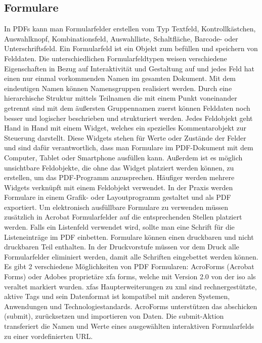 \subsection{Formulare}
In PDFs kann man Formularfelder erstellen vom Typ Textfeld, Kontrollkästchen, Auswahlknopf, Kombinationsfeld, Auswahlliste, Schaltfläche, Barcode- oder Unterschriftsfeld. Ein Formularfeld ist ein Objekt zum befüllen und speichern von Felddaten. Die unterschiedlichen Formularfeldtypen weisen verschiedene Eigenschaften in Bezug auf Interaktivität und Gestaltung auf und jedes Feld hat einen nur einmal vorkommenden Namen im gesamten Dokument. Mit dem eindeutigen Namen können Namensgruppen realisiert werden. Durch eine hierarchische Struktur mittels Teilnamen die mit einem Punkt voneinander getrennt sind mit dem äußersten Gruppennamen zuerst können Felddaten noch besser und logischer beschrieben und strukturiert werden. Jedes Feldobjekt geht Hand in Hand mit einem Widget, welches ein spezielles Kommentarobjekt zur Steuerung darstellt. Diese Widgets stehen für Werte oder Zustände der Felder und sind dafür verantwortlich, dass man Formulare im PDF-Dokument mit dem Computer, Tablet oder Smartphone ausfüllen kann. Außerdem ist es möglich unsichtbare Feldobjekte, die ohne das Widget platziert werden können, zu erstellen, um das PDF-Programm anzusprechen. Häufiger werden mehrere Widgets verknüpft mit einem Feldobjekt verwendet. \cite{softx}
In der Praxis werden Formulare in einem Grafik- oder Layoutprogramm gestaltet und als PDF exportiert. Um elektronisch ausfüllbare Formulare zu verwenden müssen zusätzlich in Acrobat Formularfelder auf die entsprechenden Stellen platziert werden. Falls ein Listenfeld verwendet wird, sollte man eine Schrift für die Listeneinträge im PDF einbetten. Formulare können einen druckbaren und nicht druckbaren Teil enthalten. In der Druckvorstufe müssen vor dem Druck alle Formularfelder eliminiert werden, damit alle Schriften eingebettet werden können. \cite{schneeberger} Es gibt 2 verschiedene Möglichkeiten von PDF Formularen: AcroForms (Acrobat Forms) oder Adobes proprietäre \gls{xfa} forms, welche mit Version 2.0 von der \gls{iso} als veraltet markiert wurden. \gls{xfa}s Haupterweiterungen zu \gls{xml} sind rechnergestützte, aktive Tags und sein Datenformat ist kompatibel mit anderen Systemen, Anwendungen und Technologiestandards. \cite{wiki-xfa} AcroForms unterstützen das abschicken (submit), zurücksetzen und importieren von Daten. Die submit-Aktion transferiert die Namen und Werte eines ausgewählten interaktiven Formularfelds zu einer vordefinierten URL.

